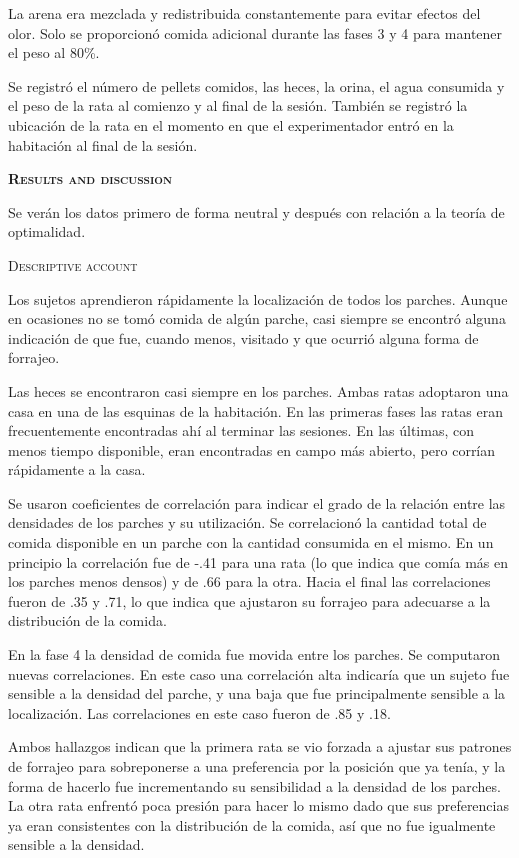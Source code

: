 \documentclass[a4paper,12pt]{article}
\begin{document}
La arena era mezclada y redistribuida constantemente para evitar efectos del olor. Solo se proporcionó comida adicional durante las fases 3 y 4 para mantener el peso al 80\%.

Se registró el número de pellets comidos, las heces, la orina, el agua consumida y el peso de la rata al comienzo y al final de la sesión. También se registró la ubicación de la rata en el momento en que el experimentador entró en la habitación al final de la sesión.

{\scshape\bfseries Results and discussion}

Se verán los datos primero de forma neutral y después con relación a la teoría de optimalidad.

{\scshape Descriptive account}

Los sujetos aprendieron rápidamente la localización de todos los parches. Aunque en ocasiones no se tomó comida de algún parche, casi siempre se encontró alguna indicación de que fue, cuando menos, visitado y que ocurrió alguna forma de forrajeo.

Las heces se encontraron casi siempre en los parches. Ambas ratas adoptaron una casa en una de las esquinas de la habitación. En las primeras fases las ratas eran frecuentemente encontradas ahí al terminar las sesiones. En las últimas, con menos tiempo disponible, eran encontradas en campo más abierto, pero corrían rápidamente a la casa.

Se usaron coeficientes de correlación para indicar el grado de la relación entre las densidades de los parches y su utilización.  Se correlacionó la cantidad total de comida disponible en un parche con la cantidad consumida en el mismo. En un principio la correlación fue de -.41 para una rata (lo que indica que comía más en los parches menos densos) y de .66 para la otra. Hacia el final las correlaciones fueron de .35 y .71, lo que indica que ajustaron su forrajeo para adecuarse a la distribución de la comida.

En la fase 4 la densidad de comida fue movida entre los parches. Se computaron nuevas correlaciones. En este caso una correlación alta indicaría que un sujeto fue sensible a la densidad del parche, y una baja que fue principalmente sensible a la localización. Las correlaciones en este caso fueron de .85 y .18.

Ambos hallazgos indican que la primera rata se vio forzada a ajustar sus patrones de forrajeo para sobreponerse a una preferencia por la posición que ya tenía, y la forma de hacerlo fue incrementando su sensibilidad a la densidad de los parches. La otra rata enfrentó poca presión para hacer lo mismo dado que sus preferencias ya eran consistentes con la distribución de la comida, así que no fue igualmente sensible a la densidad.
\end{document}
